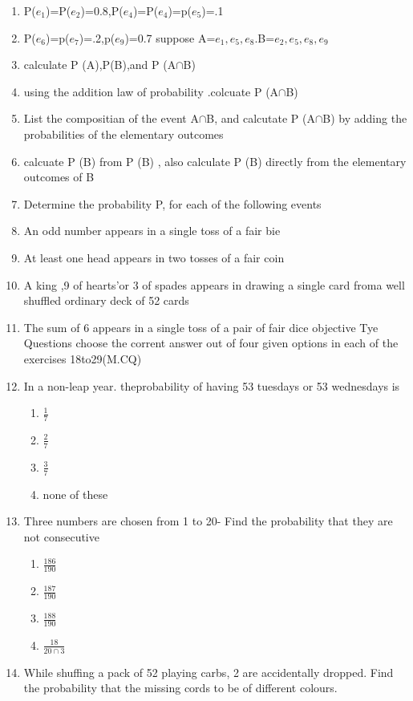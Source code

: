 \documentclass[12pt]{article}
\begin{document}
\begin{enumerate}
\item P($e_1$)=P($e_2$)=0.8,P($e_4$)=P($e_4$)=p($e_5$)=.1
\item P($e_6$)=p($e_7$)=.2,p($e_9$)=0.7
suppose A={$e_1,e_5,e_8$}.B={$e_2,e_5,e_8,e_9$}
\item calculate P (A),P(B),and P (A$\cap$B)
\item using the addition law of probability .colcuate P (A$\cap$B)
\item List the compositian of the event A$\cap$B, and calcutate P (A$\cap$B) by adding the probabilities of the elementary outcomes
\item calcuate P (B) from P (B) , also calculate P (B) directly from the elementary outcomes of B
\item Determine the probability P, for each of the following events 
\item An odd number appears in a single toss of a fair bie
\item At least one head appears in two tosses of a fair coin 
\item A king ,9 of hearts'or 3 of spades appears in drawing a single card froma well shuffled ordinary deck of 52 cards
\item The sum of 6 appears in a single toss of a pair of fair dice
objective Tye Questions
choose the corrent answer out of four given options in each of the exercises 18to29(M.CQ)
\item In a non-leap year. theprobability of having 53 tuesdays or 53 wednesdays is
\begin{enumerate}
\item $\frac{1}{7}$
\item $\frac{2}{7}$
\item $\frac{3}{7}$
\item none of these
\end{enumerate}
\item Three numbers are chosen from 1 to 20- Find the probability that they are not consecutive
\begin{enumerate}
\item $\frac{186}{190}$
\item $\frac{187}{190}$
\item $\frac{188}{190}$
\item $\frac{18}{20\cap3}$
\end{enumerate}
\item While shuffing a pack of 52 playing carbs, 2 are accidentally dropped. Find the probability that the missing cords to be of different colours.
\begin{enumerate}

\end{enumerate}
\end{enumerate}
\end{document}
